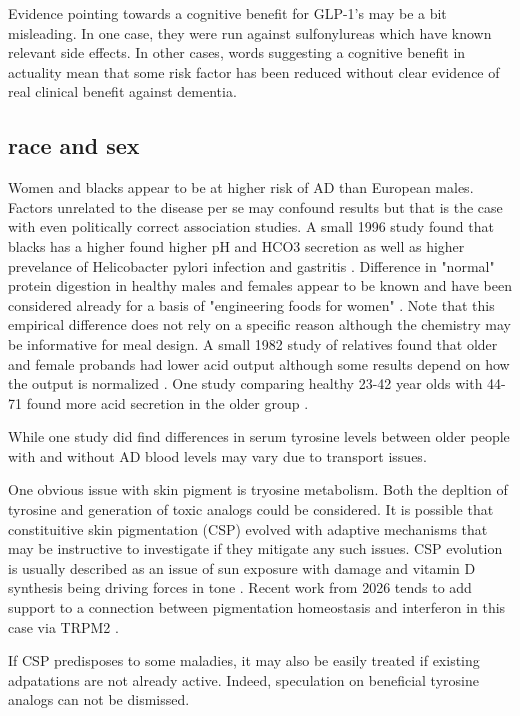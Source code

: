 Evidence pointing towards a cognitive benefit for GLP-1's may
be a bit misleading. In one case, they were run against
sulfonylureas which have known relevant side effects.
In other cases, words suggesting a cognitive benefit in actuality
mean that some risk factor has been reduced without 
clear evidence of real clinical benefit against dementia.


\subsection{race and sex }

Women and blacks appear to be at higher risk of AD 
than European males. 
Factors unrelated to the disease per se may confound results
but that is the case with even politically correct association
studies. A small 1996 study found that blacks has a higher
found higher pH and HCO3 secretion as well as higher prevelance
of Helicobacter pylori infection and gastritis \cite{PMID8956372}. 
Difference in "normal" protein digestion in healthy males and
females appear to be known and have been considered already for
a basis of "engineering foods for women" \cite{LAJTERER2022107850}.
Note that this empirical difference does not rely on a specific
reason although the chemistry may be informative for meal design.
A small 1982 study of relatives found that older and female
probands had lower acid output although some results depend on
how the output is normalized \cite{Kekki_Samloff_Ihamaki_Related_}.
One study comparing healthy 23-42 year olds with 44-71 found
more acid secretion in the older group \cite{GOLDSCHMIEDT1991977}.

While one study did find differences in serum tyrosine levels
between older people with and without AD \cite{Ma2025}
blood levels may vary due to transport issues. 

One obvious issue with skin pigment is tryosine metabolism.
Both the depltion of tyrosine and generation of toxic analogs
could be considered. It is possible that constituitive
skin pigmentation (CSP)  evolved with adaptive mechanisms that
may be instructive to investigate if they mitigate any such issues.   
CSP evolution is usually described as an issue of sun exposure
with damage and vitamin D synthesis being driving forces in tone
\cite{Jablonski_Chaplin_Human_skin_pigmentation_migration_2012}.
Recent work from 2026 tends to add support to a connection
between pigmentation homeostasis and interferon in this case
via  TRPM2 \cite{PMC13060961}.

If CSP predisposes
to some maladies, it may also be easily treated if
existing adpatations are not already active. Indeed,
speculation on beneficial tyrosine analogs can not be dismissed.

